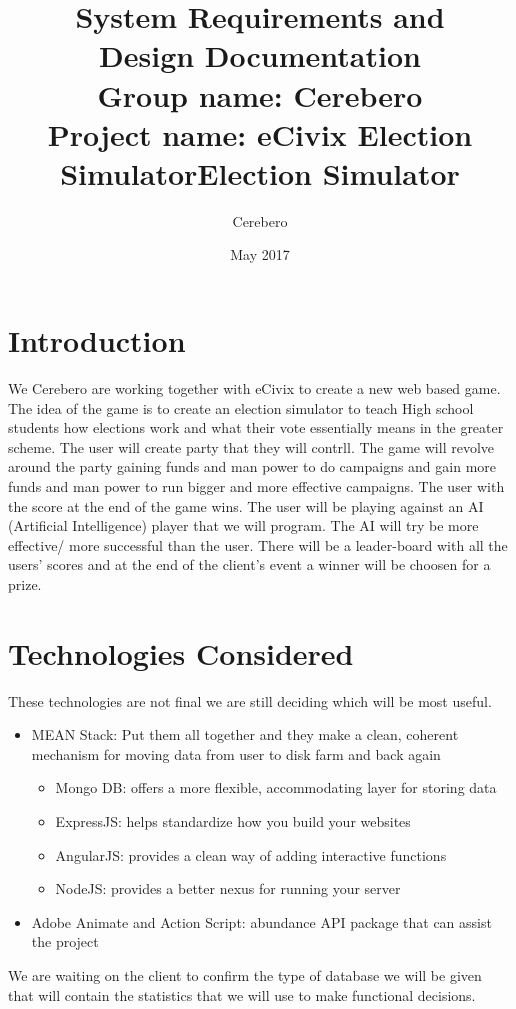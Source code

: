 \documentclass{article}
\title{\textbf{System Requirements and \\Design Documentation}\\
        \textbf{Group name:} Cerebero\\
       \textbf{ Project name:} eCivix Election Simulator}
\date{May 2017}
\author{Cerebero}
\title{Election Simulator}
\begin{document}
  
  \tableofcontents
  \newpage

 \section{Introduction}
	We Cerebero are working together with eCivix to create a new web based game. The idea of the game is to create an election simulator to teach High school students how elections work and what their vote essentially means in the greater scheme. The user will create party that they will contrll. The game will revolve around the party gaining funds and man power to do campaigns and gain more funds and man power to run bigger and more effective campaigns. The user with the score at the end of the game wins. The user will be playing against an AI (Artificial Intelligence) player that we will program. The AI will try be more effective/ more successful than the user. There will be a leader-board with all the users' scores and at the end of the client's event a winner will be choosen for a prize. 

\section{Technologies Considered}
	These technologies are not final we are still deciding which will be most useful.
	\begin{itemize}
		\item MEAN Stack: Put them all together and they make a clean, coherent mechanism for moving data from user to disk farm and back again
		\begin{itemize}
			\item Mongo DB: offers a more flexible, accommodating layer for storing data
			\item ExpressJS: helps standardize how you build your websites
			\item AngularJS: provides a clean way of adding interactive functions
			\item NodeJS: provides a better nexus for running your server
		\end{itemize}
		\item Adobe Animate and Action Script: abundance API package that can assist the project 
	\end{itemize}
	We are waiting on the client to confirm the type of database we will be given that will contain the statistics that we will use to make functional decisions.
\end{document}

